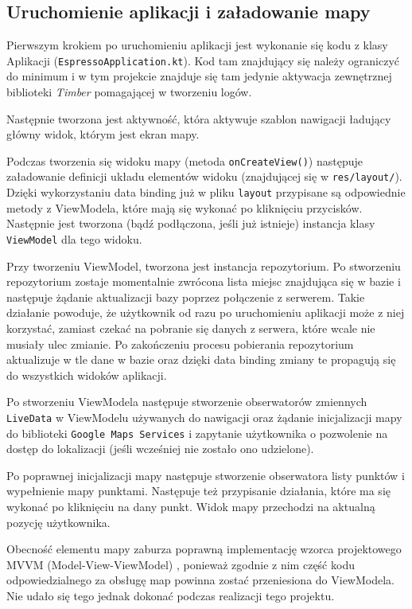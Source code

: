 \documentclass[polish,polish,a4paper,12pt]{article}
\begin{document}
	\subsection{Uruchomienie aplikacji i załadowanie mapy}

	Pierwszym krokiem po uruchomieniu aplikacji jest wykonanie się kodu z klasy Aplikacji (\texttt{EspressoApplication.kt}). Kod tam znajdujący się należy ograniczyć do minimum \cite{kotlin} i w tym projekcie znajduje się tam jedynie aktywacja zewnętrznej biblioteki \textit{Timber} pomagającej w tworzeniu logów.

	Następnie tworzona jest aktywność, która aktywuje szablon nawigacji ładujący główny widok, którym jest ekran mapy.

	Podczas tworzenia się widoku mapy (metoda \texttt{onCreateView()}) następuje załadowanie definicji układu elementów widoku (znajdującej się w \texttt{res/layout/}). Dzięki wykorzystaniu data binding już w pliku \texttt{layout} przypisane są odpowiednie metody z ViewModela, które mają się wykonać po kliknięciu przycisków. Następnie jest tworzona (bądź podłączona, jeśli już istnieje) instancja klasy \texttt{ViewModel} dla tego widoku.

	Przy tworzeniu ViewModel, tworzona jest instancja repozytorium. Po stworzeniu repozytorium zostaje momentalnie zwrócona lista miejsc znajdująca się w bazie i następuje żądanie aktualizacji bazy poprzez połączenie z serwerem. Takie działanie powoduje, że użytkownik od razu po uruchomieniu aplikacji może z niej korzystać, zamiast czekać na pobranie się danych z serwera, które wcale nie musiały ulec zmianie. Po zakończeniu procesu pobierania repozytorium aktualizuje w tle dane w bazie oraz dzięki data binding zmiany te propagują się do wszystkich widoków aplikacji.

	Po stworzeniu ViewModela następuje stworzenie obserwatorów zmiennych \texttt{LiveData} w ViewModelu używanych do nawigacji oraz żądanie inicjalizacji mapy do biblioteki \texttt{Google Maps Services} i zapytanie użytkownika o pozwolenie na dostęp do lokalizacji (jeśli wcześniej nie zostało ono udzielone).

	Po poprawnej inicjalizacji mapy następuje stworzenie obserwatora listy punktów i wypełnienie mapy punktami. Następuje też przypisanie działania, które ma się wykonać po kliknięciu na dany punkt. Widok mapy przechodzi na aktualną pozycję użytkownika.

	Obecność elementu mapy zaburza poprawną implementację wzorca projektowego MVVM (Model-View-ViewModel) \cite{mvvmwiki}, ponieważ zgodnie z nim część kodu odpowiedzialnego za obsługę map powinna zostać przeniesiona do ViewModela. Nie udało się tego jednak dokonać podczas realizacji tego projektu.
\end{document}
